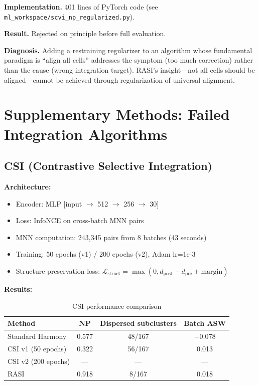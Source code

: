 \documentclass[10pt]{article}
\begin{document}
\textbf{Implementation.} 401 lines of PyTorch code (see \texttt{ml\_workspace/scvi\_np\_regularized.py}).

\textbf{Result.} Rejected on principle before full evaluation.

\textbf{Diagnosis.} Adding a restraining regularizer to an algorithm whose fundamental paradigm is ``align all cells'' addresses the symptom (too much correction) rather than the cause (wrong integration target). RASI's insight---not all cells should be aligned---cannot be achieved through regularization of universal alignment.

\section{Supplementary Methods: Failed Integration Algorithms}

\subsection{CSI (Contrastive Selective Integration)}

\textbf{Architecture:}
\begin{itemize}
\item Encoder: MLP [input $\to$ 512 $\to$ 256 $\to$ 30]
\item Loss: InfoNCE on cross-batch MNN pairs
\item MNN computation: 243,345 pairs from 8 batches (43 seconds)
\item Training: 50 epochs (v1) / 200 epochs (v2), Adam lr=1e-3
\item Structure preservation loss: $\mathcal{L}_{\text{struct}} = \max(0, d_{\text{post}} - d_{\text{pre}} + \text{margin})$
\end{itemize}

\textbf{Results:}
\begin{table}[H]
\centering
\caption{CSI performance comparison}
\begin{tabular}{lccc}
\toprule
Method & NP & Dispersed subclusters & Batch ASW \\
\midrule
Standard Harmony & 0.577 & 48/167 & $-$0.078 \\
CSI v1 (50 epochs) & 0.322 & 56/167 & 0.013 \\
CSI v2 (200 epochs) & --- & --- & --- \\
RASI & 0.918 & 8/167 & 0.018 \\
\bottomrule
\end{tabular}
\end{table}
\end{document}
